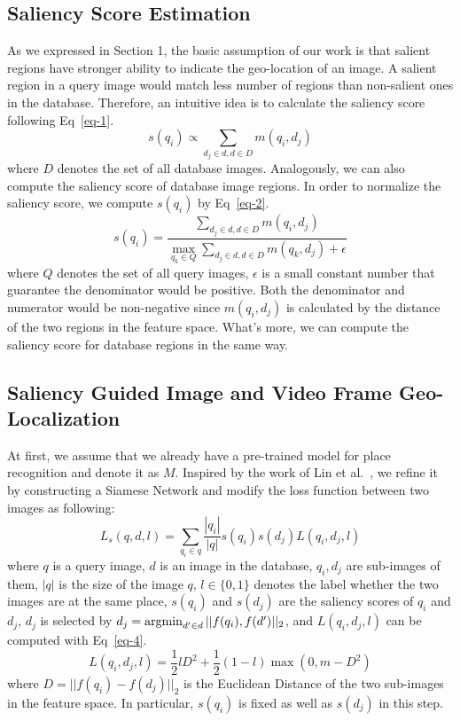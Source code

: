 \subsection{Saliency Score Estimation}
\par
As we expressed in Section 1, the basic assumption of our work is that salient regions have stronger ability to indicate the geo-location of an image. A salient region in a query image would match less number of regions than non-salient ones in the database. Therefore, an intuitive idea is to calculate the saliency score following Eq~\eqref{eq-1}.
\begin{equation}
s(q_i) \propto \sum_{d_j \in d, d \in D} m(q_i, d_j)
\label{eq-1}
\end{equation}
where $D$ denotes the set of all database images. Analogously, we can also compute the saliency score of database image regions. In order to normalize the saliency score, we compute $s(q_i)$ by Eq~\eqref{eq-2}.
\begin{equation}
s(q_i) = \frac{\sum_{d_j \in d, d \in D} m(q_i, d_j)}{\max_{q_k \in Q}\sum_{d_j \in d, d \in D} m(q_k, d_j) + \epsilon}
\label{eq-2}
\end{equation}
where $Q$ denotes the set of all query images, $\epsilon$ is a small constant number that guarantee the denominator would be positive. Both the denominator and numerator would be non-negative since $m(q_i, d_j)$ is calculated by the distance of the two regions in the feature space. What's more, we can compute the saliency score for database regions in the same way. 
\subsection{Saliency Guided Image and Video Frame Geo-Localization}
\par
At first, we assume that we already have a pre-trained model for place recognition and denote it as $M$. Inspired by the work of Lin et al.~\cite{lin2015learning}, we refine it by constructing a Siamese Network and modify the loss function between two images as following:
\begin{equation}
\label{eq-3}
L_s(q,d,l) = \sum_{q_i\in q} \frac{|q_i|}{|q|} s(q_i)s(d_j)L(q_i, d_j, l)
\end{equation}
where $q$ is a query image, $d$ is an image in the database, $q_i, d_j$ are sub-images of them, $|q|$ is the size of the image $q$, $l\in \{0,1\}$ denotes the label whether the two images are at the same place, $s(q_i)$ and $s(d_j)$ are the saliency scores of $q_i$ and $d_j$, $d_j$ is selected by $d_j = \operatorname*{argmin}_{{d'} \in d} ||f(q_i), f({d'})||_2 $, and $L(q_i, d_j, l)$ can be computed with Eq~\eqref{eq-4}.
\begin{equation}
\label{eq-4}
L(q_i, d_j, l)=\frac{1}{2}lD^2 + \frac{1}{2}(1-l)\max(0,m-D^2)
\end{equation}
where $D = ||f(q_i) - f(d_j)||_2$ is the Euclidean Distance of the two sub-images in the feature space. In particular, $s(q_i)$ is fixed as well as $s(d_j)$ in this step. 
